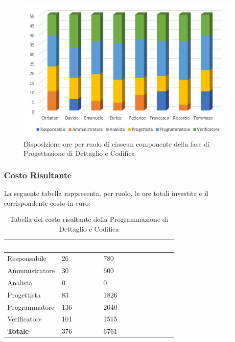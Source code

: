 \begin{figure}[h!]
\centering

\includegraphics[scale=2.5]{Sezioni/Istogrammi/IstogrammaDiDettaglio.png}
\caption{Disposizione ore per ruolo di ciascun componente della fase di Progettazione di Dettaglio e Codifica}
\end{figure}

\subsubsection{Costo Risultante}
La seguente tabella rappresenta, per ruolo, le ore totali investite e il corrispondente costo in euro:
{
\renewcommand{\arraystretch}{2}
\centering

\begin{longtable}[h]{ C{3cm} C{2cm} C{4cm}}
\caption{Tabella del costo risultante della Programmazione di Dettaglio e Codifica}\\
	\textcolor{white}{\textbf{Ruolo}} & 
	\textcolor{white}{\textbf{Totale ore}} & 
	\textcolor{white}{\textbf{Costo ruolo in euro}}\\	
\endhead
        
        Responsabile & 26 & 780 \\
        Amministratore & 30 & 600 \\
        Analista & 0 & 0 \\
        Progettista & 83 & 1826 \\
        Programmatore & 136 & 2040 \\
        Verificatore & 101 & 1515\\
        \textbf{Totale} & 376 & 6761 \\
		
	\end{longtable}

}

